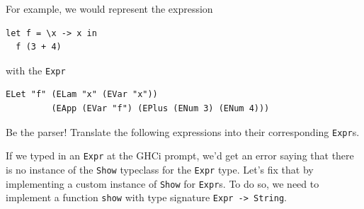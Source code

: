 \documentclass[addpoints]{exam}
\begin{document}
\begin{questions}
For example, we would represent the expression

\begin{verbatim}
let f = \x -> x in
  f (3 + 4)
\end{verbatim}

with the \verb|Expr|

\begin{verbatim}
ELet "f" (ELam "x" (EVar "x"))
         (EApp (EVar "f") (EPlus (ENum 3) (ENum 4)))
\end{verbatim}

\question Be the parser! Translate the following expressions into their corresponding \texttt{Expr}s.


\newpage

\question If we typed in an \verb|Expr| at the GHCi prompt, we'd get an error saying that there is no instance of the \verb|Show| typeclass for the \verb|Expr| type.  Let's fix that by implementing a custom instance of \verb|Show| for \verb|Expr|s.  To do so, we need to implement a function \verb|show| with type signature \verb|Expr -> String|.


\end{questions}
\end{document}
